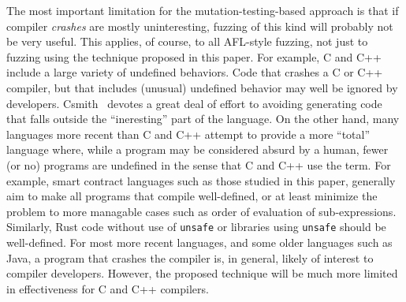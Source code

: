 The most important limitation for the mutation-testing-based approach is that if compiler \emph{crashes} are mostly uninteresting, fuzzing of this kind will probably not be very useful.  This applies, of course, to all AFL-style fuzzing, not just to fuzzing using the technique proposed in this paper.  For example, C and C++ include a large variety of undefined behaviors.  Code that crashes a C or C++ compiler, but that includes (unusual) undefined behavior may well be ignored by developers.  Csmith~\cite{csmith} devotes a great deal of effort to avoiding generating code that falls outside the ``ineresting'' part of the language.  On the other hand, many languages more recent than C and C++ attempt to provide a more ``total'' language where, while a program may be considered absurd by a human, fewer (or no) programs are undefined in the sense that C and C++ use the term.  For example, smart contract languages such as those studied in this paper, generally aim to make all programs that compile well-defined, or at least minimize the problem to more managable cases such as order of evaluation of sub-expressions.  Similarly, Rust code without use of {\tt unsafe} or libraries using {\tt unsafe} should be well-defined.  For most more recent languages, and some older languages such as Java, a program that crashes the compiler is, in general, likely of interest to compiler developers.  However, the proposed technique will be much more limited in effectiveness for C and C++ compilers.
